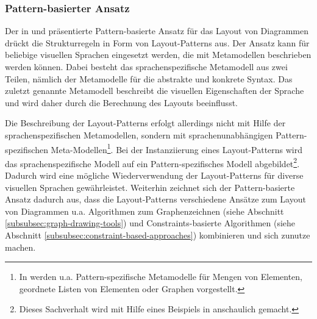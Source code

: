 


\subsubsection{Pattern-basierter Ansatz}
\label{subsubsec:pattern-based-approach}

Der in \cite{Maier12A-Pattern-based} und \cite{MaierMinas10Combination} präsentierte Pattern-basierte Ansatz für das Layout von Diagrammen drückt die Strukturregeln in Form von Layout-Patterns aus. Der Ansatz kann für beliebige visuellen Sprachen eingesetzt werden, die mit Metamodellen beschrieben werden können. Dabei besteht das sprachenspezifische Metamodell aus zwei Teilen, nämlich der Metamodelle für die abstrakte und konkrete Syntax. Das zuletzt genannte Metamodell beschreibt die visuellen Eigenschaften der Sprache und wird daher durch die Berechnung des Layouts beeinflusst.

Die Beschreibung der Layout-Patterns erfolgt allerdings nicht mit Hilfe der sprachenspezifischen Metamodellen, sondern mit sprachenunabhängigen Pattern-spezifischen Meta-Model\-len\footnote{In \cite{Maier12A-Pattern-based} werden u.a. Pattern-spezifische Metamodelle für Mengen von Elementen, geordnete Listen von Elementen oder Graphen vorgestellt.}. Bei der Instanziierung eines Layout-Patterns wird das sprachenspezifische Modell auf ein Pattern-spezifisches Modell abgebildet\footnote{Dieses Sachverhalt wird mit Hilfe eines Beispiels in \cite[S.59ff]{Maier12A-Pattern-based} anschaulich gemacht.}. Dadurch wird eine mögliche Wiederverwendung der Layout-Patterns für diverse visuellen Sprachen gewährleistet. Weiterhin zeichnet sich der Pattern-basierte Ansatz dadurch aus, dass die Layout-Patterns verschiedene Ansätze zum Layout von Diagrammen u.a. Algorithmen zum Graphenzeichnen (siehe Abschnitt \ref{subsubsec:graph-drawing-tools}) und Constraints-basierte Algorithmen (siehe Abschnitt \ref{subsubsec:constraint-based-approaches}) kombinieren und sich zunutze machen.




